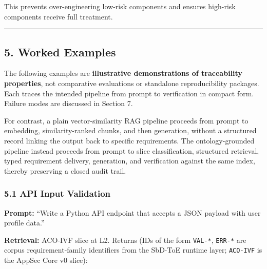 \documentclass[
]{article}
\begin{document}
This prevents over-engineering low-risk components and ensures high-risk
components receive full treatment.

\begin{center}\rule{0.5\linewidth}{0.5pt}\end{center}

\subsection{5. Worked Examples}\label{worked-examples}

The following examples are \textbf{illustrative demonstrations of
traceability properties}, not comparative evaluations or standalone
reproducibility packages. Each traces the intended pipeline from prompt
to verification in compact form. Failure modes are discussed in Section
7.

For contrast, a plain vector-similarity RAG pipeline proceeds from
prompt to embedding, similarity-ranked chunks, and then generation,
without a structured record linking the output back to specific
requirements. The ontology-grounded pipeline instead proceeds from
prompt to slice classification, structured retrieval, typed requirement
delivery, generation, and verification against the same index, thereby
preserving a closed audit trail.

\subsubsection{5.1 API Input Validation}\label{api-input-validation}

\textbf{Prompt:} ``Write a Python API endpoint that accepts a JSON
payload with user profile data.''

\textbf{Retrieval:} ACO-IVF slice at L2. Returns (IDs of the form
\texttt{VAL-*}, \texttt{ERR-*} are corpus requirement-family identifiers
from the SbD-ToE runtime layer; \texttt{ACO-IVF} is the AppSec Core v0
slice):
\end{document}
